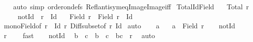 \begin{isabellebody}
%
\isadelimproof
\ \ %
\endisadelimproof
%
\isatagproof
{}\isamarkupfalse%
\ {\isacharparenleft}{\kern0pt}auto\ simp{\isacharcolon}{\kern0pt}\ order{\isacharunderscore}{\kern0pt}on{\isacharunderscore}{\kern0pt}defs\ Refl{\isacharunderscore}{\kern0pt}antisym{\isacharunderscore}{\kern0pt}eq{\isacharunderscore}{\kern0pt}Image{}{\isacharunderscore}{\kern0pt}Image{}{\isacharunderscore}{\kern0pt}iff{\isacharparenright}{\kern0pt}%
\endisatagproof
{\isafoldproof}%
%
\isadelimproof
\isanewline
%
\endisadelimproof
\isanewline
{}\isamarkupfalse%
\ Total{\isacharunderscore}{\kern0pt}Id{\isacharunderscore}{\kern0pt}Field{\isacharcolon}{\kern0pt}\isanewline
\ \ \ {\isachardoublequoteopen}Total\ r{\isachardoublequoteclose}\isanewline
\ \ \ \ \ not{\isacharunderscore}{\kern0pt}Id{\isacharcolon}{\kern0pt}\ {\isachardoublequoteopen}{\isasymnot}\ r\ {\isasymsubseteq}\ Id{\isachardoublequoteclose}\isanewline
\ \ \ {\isachardoublequoteopen}Field\ r\ {\isacharequal}{\kern0pt}\ Field\ {\isacharparenleft}{\kern0pt}r\ {\isacharminus}{\kern0pt}\ Id{\isacharparenright}{\kern0pt}{\isachardoublequoteclose}\isanewline
%
\isadelimproof
\ \ %
\endisadelimproof
%
\isatagproof
{}\isamarkupfalse%
\ mono{\isacharunderscore}{\kern0pt}Field{\isacharbrackleft}{\kern0pt}of\ {\isachardoublequoteopen}r\ {\isacharminus}{\kern0pt}\ Id{\isachardoublequoteclose}\ r{\isacharbrackright}{\kern0pt}\ Diff{\isacharunderscore}{\kern0pt}subset{\isacharbrackleft}{\kern0pt}of\ r\ Id{\isacharbrackright}{\kern0pt}\isanewline
{}\isamarkupfalse%
\ auto\isanewline
\ \ \isamarkupfalse%
\ a\ \isamarkupfalse%
\ {\isacharasterisk}{\kern0pt}{\isacharcolon}{\kern0pt}\ {\isachardoublequoteopen}a\ {\isasymin}\ Field\ r{\isachardoublequoteclose}\isanewline
\ \ \isamarkupfalse%
\ not{\isacharunderscore}{\kern0pt}Id\ \isamarkupfalse%
\ {\isachardoublequoteopen}r\ {\isasymnoteq}\ {\isacharbraceleft}{\kern0pt}{\isacharbraceright}{\kern0pt}{\isachardoublequoteclose}\ \isamarkupfalse%
\ fast\isanewline
\ \ \isamarkupfalse%
\ not{\isacharunderscore}{\kern0pt}Id\ \isamarkupfalse%
\ b\ \ c\ \ {\isachardoublequoteopen}b\ {\isasymnoteq}\ c\ {\isasymand}\ {\isacharparenleft}{\kern0pt}b{\isacharcomma}{\kern0pt}c{\isacharparenright}{\kern0pt}\ {\isasymin}\ r{\isachardoublequoteclose}\ \isamarkupfalse%
\ auto\isanewline
\ \ \isamarkupfalse%

\end{isabellebody}
